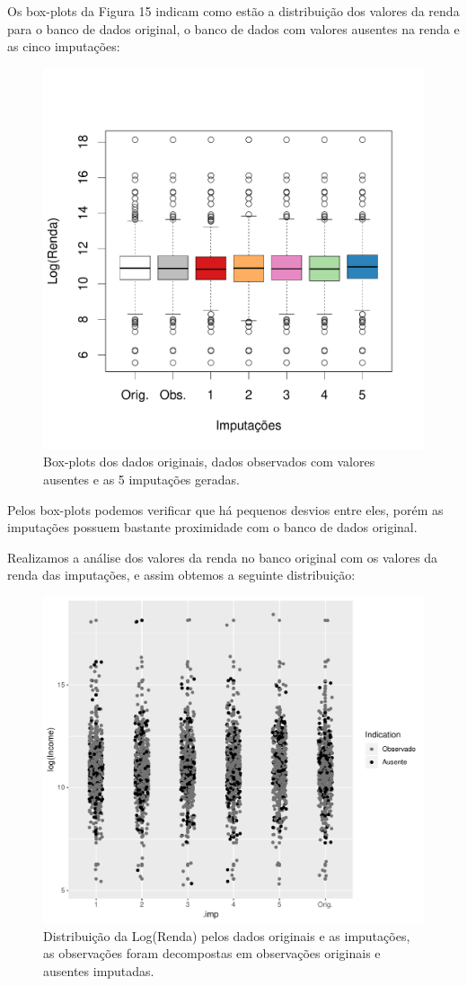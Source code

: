 \documentclass[]{article}
\begin{document}
Os box-plots da Figura 15 indicam como estão a distribuição dos valores
da renda para o banco de dados original, o banco de dados com valores
ausentes na renda e as cinco imputações:

\begin{figure}[H]

{\centering \includegraphics[width=0.6\linewidth]{p56-graf} 

}

\caption{Box-plots dos dados originais, dados observados com valores ausentes e as 5 imputações geradas.}\label{fig:unnamed-chunk-23}
\end{figure}

Pelos box-plots podemos verificar que há pequenos desvios entre eles,
porém as imputações possuem bastante proximidade com o banco de dados
original.

Realizamos a análise dos valores da renda no banco original com os
valores da renda das imputações, e assim obtemos a seguinte
distribuição:

\begin{figure}[H]

{\centering \includegraphics[width=0.6\linewidth]{Relatorio_IC_files/figure-latex/unnamed-chunk-24-1} 

}

\caption{Distribuição da Log(Renda) pelos dados originais e as imputações, as observações foram decompostas em observações originais e ausentes imputadas.}\label{fig:unnamed-chunk-24}
\end{figure}
\end{document}
